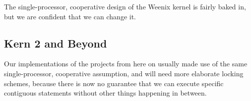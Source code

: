 \documentclass{article}
\begin{document}
The single-processor, cooperative design of the Weenix kernel is fairly baked in, but we are confident that
we can change it.

\subsection{Kern 2 and Beyond}

Our implementations of the projects from here on usually made use of the same single-processor, cooperative
assumption, and will need more elaborate locking schemes, because there is now no guarantee that we can
execute specific contiguous statements without other things happening in between.
\end{document}
